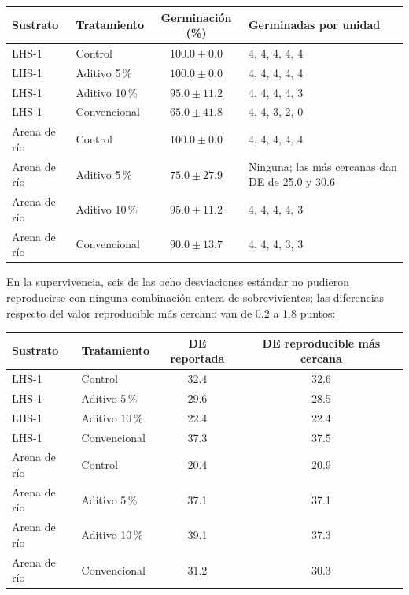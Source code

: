 \documentclass[11pt]{article}
\begin{document}
\begin{center}
\small
\begin{tabular}{llcl}
\hline\hline
\textbf{Sustrato} & \textbf{Tratamiento} & \textbf{Germinación (\%)} & \textbf{Germinadas por unidad} \\
\hline
LHS-1 & Control & $100.0 \pm 0.0$ & 4, 4, 4, 4, 4 \\
LHS-1 & Aditivo 5\,\% & $100.0 \pm 0.0$ & 4, 4, 4, 4, 4 \\
LHS-1 & Aditivo 10\,\% & $95.0 \pm 11.2$ & 4, 4, 4, 4, 3 \\
LHS-1 & Convencional & $65.0 \pm 41.8$ & 4, 4, 3, 2, 0 \\
\hline
Arena de río & Control & $100.0 \pm 0.0$ & 4, 4, 4, 4, 4 \\
Arena de río & Aditivo 5\,\% & $75.0 \pm 27.9$ & Ninguna; las más cercanas dan DE de 25.0 y 30.6 \\
Arena de río & Aditivo 10\,\% & $95.0 \pm 11.2$ & 4, 4, 4, 4, 3 \\
Arena de río & Convencional & $90.0 \pm 13.7$ & 4, 4, 4, 3, 3 \\
\hline
\end{tabular}
\end{center}

En la supervivencia, seis de las ocho desviaciones estándar no pudieron reproducirse con ninguna combinación entera de sobrevivientes; las diferencias respecto del valor reproducible más cercano van de 0.2 a 1.8 puntos:

\begin{center}
\small
\begin{tabular}{llcc}
\hline\hline
\textbf{Sustrato} & \textbf{Tratamiento} & \textbf{DE reportada} & \textbf{DE reproducible más cercana} \\
\hline
LHS-1 & Control & 32.4 & 32.6 \\
LHS-1 & Aditivo 5\,\% & 29.6 & 28.5 \\
LHS-1 & Aditivo 10\,\% & 22.4 & 22.4 \\
LHS-1 & Convencional & 37.3 & 37.5 \\
\hline
Arena de río & Control & 20.4 & 20.9 \\
Arena de río & Aditivo 5\,\% & 37.1 & 37.1 \\
Arena de río & Aditivo 10\,\% & 39.1 & 37.3 \\
Arena de río & Convencional & 31.2 & 30.3 \\
\hline
\end{tabular}
\end{center}
\end{document}
